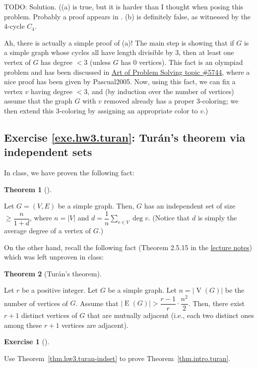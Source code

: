 \documentclass[numbers=enddot,12pt,final,onecolumn,notitlepage]{scrartcl}%
\newcounter{exer}
\theoremstyle{definition}
\newtheorem{theo}{Theorem}[section]
\newenvironment{theorem}[1][]
{\begin{theo}[#1]\begin{leftbar}}
{\end{leftbar}\end{theo}}
\newtheorem{exmp}[exer]{Exercise}
\newenvironment{exercise}[1][]
{\begin{exmp}[#1]\begin{leftbar}}
{\end{leftbar}\end{exmp}}
\let\sumnonlimits\sum
\renewcommand{\sum}{\sumnonlimits\limits}
\newcommand{\abs}[1]{\left| #1 \right|}
\newcommand{\tup}[1]{\left( #1 \right)}
\newcommand{\verts}[1]{\operatorname{V}\left( #1 \right)}
\newcommand{\edges}[1]{\operatorname{E}\left( #1 \right)}
\begin{document}
TODO: Solution. ((a) is true, but it is harder than I thought
when posing this problem. Probably a proof appears in
\cite{AGJJ09}. (b) is definitely false,
as witnessed by the $4$-cycle $C_4$.

Ah, there is actually a simple proof of (a)! The main step is
showing that if $G$ is a simple graph whose cycles all have length
divisible by $3$, then at least one vertex of $G$ has degree $< 3$
(unless $G$ has $0$ vertices).
This fact is an olympiad problem and has been discussed in
\href{https://artofproblemsolving.com/community/c6h5744}{Art of Problem Solving topic \#5744},
where a nice proof has been given by Pascual2005.
Now, using this fact, we can fix a vertex $v$ having degree $< 3$,
and (by induction over the number of vertices) assume that the
graph $G$ with $v$ removed already has a proper $3$-coloring;
we then extend this $3$-coloring by assigning an appropriate
color to $v$.)

\subsection{Exercise \ref{exe.hw3.turan}: Tur\'an's theorem via
independent sets}

In class, we have proven the following fact:

\begin{theorem} \label{thm.hw3.turan-indset}
Let $G = \tup{V, E}$ be a simple graph.
Then, $G$ has an independent set of size
$\geq \dfrac{n}{1+d}$, where $n = \abs{V}$ and
$d = \dfrac{1}{n} \sum_{v \in V} \deg v$.
(Notice that $d$ is simply the average degree of a vertex of $G$.)
\end{theorem}

On the other hand, recall the following fact
(Theorem 2.5.15 in the
\href{http://www-users.math.umn.edu/~dgrinber/5707s17/nogra.pdf}{lecture notes})
which was left unproven in class:

\begin{theorem}[Tur\'an's theorem] \label{thm.intro.turan}
Let $r$ be a positive integer.
Let $G$ be a simple graph. Let $n = \abs{\verts{G}}$ be the number of
vertices of $G$. Assume that
$\abs{\edges{G}} > \dfrac{r-1}{r} \cdot \dfrac{n^2}{2}$. Then, there
exist $r + 1$ distinct vertices
of $G$ that are mutually adjacent (i.e., each two distinct ones among
these $r + 1$ vertices are adjacent).
\end{theorem}

\begin{exercise} \label{exe.hw3.turan}
Use Theorem~\ref{thm.hw3.turan-indset} to prove
Theorem~\ref{thm.intro.turan}.
\end{exercise}
\end{document}
